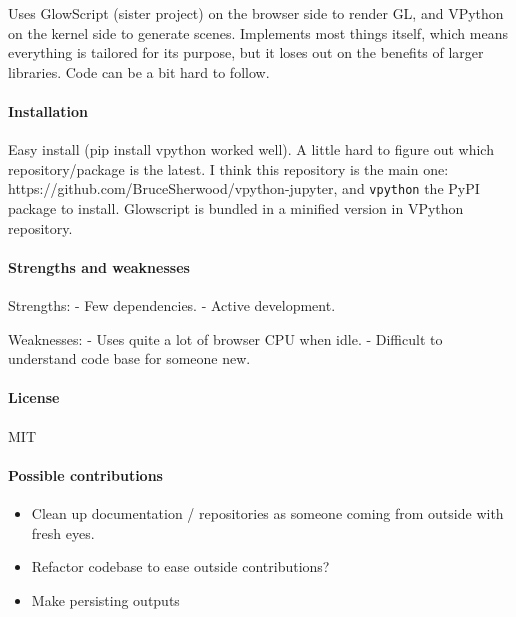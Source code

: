 Uses GlowScript (sister project) on the browser side to render GL, and
VPython on the kernel side to generate scenes. Implements most things
itself, which means everything is tailored for its purpose, but it loses
out on the benefits of larger libraries. Code can be a bit hard to
follow.

\hypertarget{installation}{%
\paragraph{Installation}\label{installation}}

Easy install (pip install vpython worked well). A little hard to figure
out which repository/package is the latest. I think this repository is
the main one: https://github.com/BruceSherwood/vpython-jupyter, and
\texttt{vpython} the PyPI package to install. Glowscript is bundled in a
minified version in VPython repository.

\hypertarget{strengths-and-weaknesses}{%
\paragraph{Strengths and
weaknesses}\label{strengths-and-weaknesses}}

Strengths: - Few dependencies. - Active development.

Weaknesses: - Uses quite a lot of browser CPU when idle. - Difficult to
understand code base for someone new.

\hypertarget{license}{%
\paragraph{License}\label{license}}

MIT

\hypertarget{possible-contributions}{%
\paragraph{Possible contributions}\label{possible-contributions}}

\begin{itemize}
\tightlist
\item
  Clean up documentation / repositories as someone coming from outside
  with fresh eyes.
\item
  Refactor codebase to ease outside contributions?
\item
  Make persisting outputs
\end{itemize}

